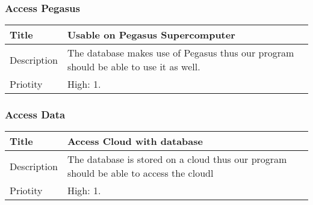 \subsubsection{Access Pegasus}
  \begin{table}[h!]
    \begin{tabularx}{\textwidth}{|l|X|}
      \hline
      Title       & Usable on Pegasus Supercomputer \\ \hline
      Description & The database makes use of Pegasus thus our program should be
                    able to use it as well. \\ \hline
      Priotity    & High: 1. \\ \hline
    \end{tabularx}
  \end{table}

\subsubsection{Access Data}
  \begin{table}[h!]
    \begin{tabularx}{\textwidth}{|l|X|}
      \hline
      Title        & Access Cloud with database \\ \hline
      Description  & The database is stored on a cloud thus our program should
                     be able to access the cloudl \\ \hline
      Priotity     & High: 1. \\ \hline
    \end{tabularx}
  \end{table}
